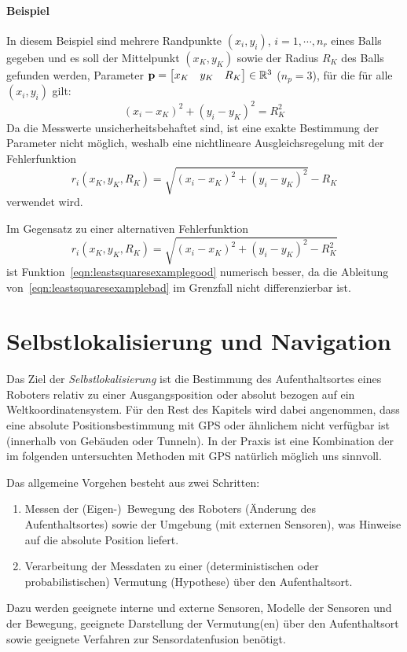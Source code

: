 			\paragraph{Beispiel}
				In diesem Beispiel sind mehrere Randpunkte \( (x_i, y_i) \), \( i = 1, \cdots, n_r \) eines Balls gegeben und es soll der Mittelpunkt \( (x_K, y_K) \) sowie der Radius \( R_K \) des Balls gefunden werden, \dh Parameter \( \boldsymbol{\mathrm{p}} = \begin{bmatrix} x_K & y_K & R_K \end{bmatrix} \in \mathbb{R}^3 \) (\( n_p = 3 \)), für die für alle \( (x_i, y_i) \) gilt:
				\begin{equation*}
					(x_i - x_K)^2 + (y_i - y_K)^2 = R_K^2 \tag{Kreisgleichung}
				\end{equation*}
				Da die Messwerte unsicherheitsbehaftet sind, ist eine exakte Bestimmung der Parameter nicht möglich, weshalb eine nichtlineare Ausgleichsregelung mit der Fehlerfunktion
				\begin{equation}
					r_i(x_K, y_K, R_K) = \sqrt{(x_i - x_K)^2 + (y_i - y_K)^2} - R_K \label{eqn:leastsquaresexamplegood}
				\end{equation}
				verwendet wird.
				
				Im Gegensatz zu einer alternativen Fehlerfunktion
				\begin{equation}
					r_i(x_K, y_K, R_K) = \sqrt{(x_i - x_K)^2 + (y_i - y_K)^2 - R_K^2} \label{eqn:leastsquaresexamplebad}
				\end{equation}
				ist Funktion~\ref{eqn:leastsquaresexamplegood} numerisch besser, da die Ableitung von~\ref{eqn:leastsquaresexamplebad} im Grenzfall nicht differenzierbar ist.

	\section{Selbstlokalisierung und Navigation}
		Das Ziel der \emph{Selbstlokalisierung} ist die Bestimmung des Aufenthaltsortes eines Roboters relativ zu einer Ausgangsposition oder absolut bezogen auf ein Weltkoordinatensystem. Für den Rest des Kapitels wird dabei angenommen, dass eine absolute Positionsbestimmung mit GPS oder ähnlichem nicht verfügbar ist (\zB innerhalb von Gebäuden oder Tunneln). In der Praxis ist eine Kombination der im folgenden untersuchten Methoden mit GPS natürlich möglich uns sinnvoll.
		
		Das allgemeine Vorgehen besteht aus zwei Schritten:
		\begin{enumerate}
			\item Messen der (Eigen-)~Bewegung des Roboters (Änderung des Aufenthaltsortes) sowie der Umgebung (mit externen Sensoren), was Hinweise auf die absolute Position liefert.
			\item Verarbeitung der Messdaten zu einer (deterministischen oder probabilistischen) Vermutung (Hypothese) über den Aufenthaltsort.
		\end{enumerate}
		Dazu werden geeignete interne und externe Sensoren, Modelle der Sensoren und der Bewegung, geeignete Darstellung der Vermutung(en) über den Aufenthaltsort sowie geeignete Verfahren zur Sensordatenfusion benötigt.
		
